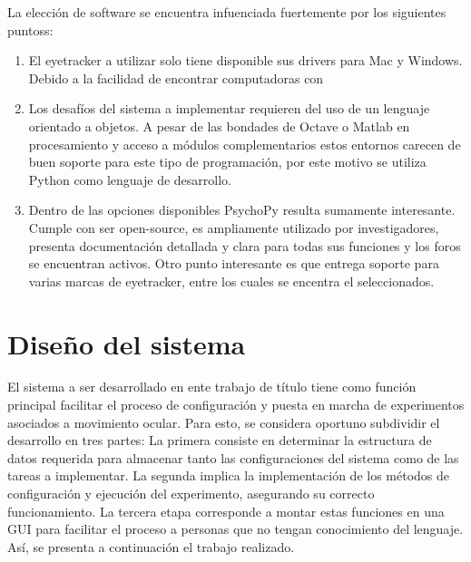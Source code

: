 \documentclass[\main/main.tex]{subfiles}
\begin{document}
	\newpage
	La elección de software se encuentra infuenciada fuertemente por los siguientes puntoss:
	\begin{enumerate}
		\item El eyetracker a utilizar solo tiene disponible sus drivers para Mac y Windows. Debido a la facilidad de encontrar computadoras con %

		\item Los desafíos del sistema a implementar requieren del uso de un lenguaje orientado a objetos. A pesar de las bondades de Octave o Matlab en procesamiento y acceso a módulos complementarios estos entornos carecen de buen soporte para este tipo de programación, por este motivo se utiliza Python como lenguaje de desarrollo. 

		\item Dentro de las opciones disponibles PsychoPy resulta sumamente interesante. Cumple con ser open-source, es ampliamente utilizado por investigadores, presenta documentación detallada y clara para todas sus funciones y los foros se encuentran activos. Otro punto interesante es que entrega soporte para varias marcas de eyetracker, entre los cuales se encentra el seleccionados.

	\end{enumerate}

\section{Diseño del sistema}
\label{sec:03_diseño_sistema}
	El sistema a ser desarrollado en ente trabajo de título tiene como función principal facilitar el proceso de configuración y puesta en marcha de experimentos asociados a movimiento ocular. Para esto, se considera oportuno subdividir el desarrollo en tres partes: La primera consiste en determinar la estructura de datos requerida para almacenar tanto las configuraciones del sistema como de las tareas a implementar. La segunda implica la implementación de los métodos de configuración y ejecución del experimento, asegurando su correcto funcionamiento. La tercera etapa corresponde a montar estas funciones en una GUI para facilitar el proceso a personas que no tengan conocimiento del lenguaje. Así, se presenta a continuación el trabajo realizado.
\end{document}

